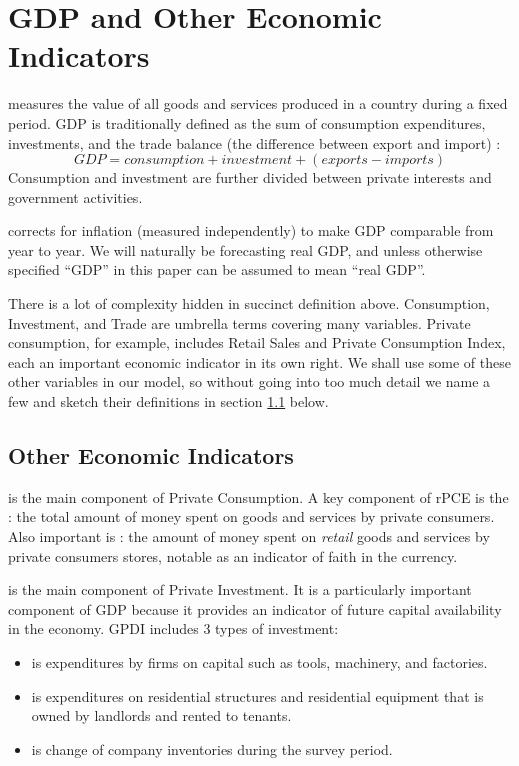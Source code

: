 \section{GDP and Other Economic Indicators}

     measures the value of all goods and
    services produced in a country during a fixed period.  GDP is traditionally defined
    as the sum of consumption expenditures, investments, and the trade balance (the
    difference between export and import) \cite{samuelson}:
    \[ GDP = consumption + investment + (exports - imports) \]
    Consumption and investment are further divided between private
    interests and government activities.

     corrects for inflation (measured independently) to make
    GDP comparable from year to year.  We will naturally be forecasting real GDP,
    and unless otherwise specified ``GDP'' in this paper can be assumed to 
    mean ``real GDP''.

    There is a lot of complexity hidden in succinct definition above.
    Consumption, Investment, and Trade are umbrella terms covering many 
    variables.  Private consumption, for example, includes Retail Sales and 
    Private Consumption Index, each an important economic indicator in its own 
    right.  We shall use some of these other variables in our model,
    so without going into too much detail we name a few and sketch their definitions
    in section \ref{sec:indicators} below.

\subsection{Other Economic Indicators} \label{sec:indicators}

     is the main component of 
    Private Consumption.  A key component of rPCE is the : the total amount of money spent on goods and 
    services by private consumers. Also important is : the amount of money spent on \emph{retail} goods and services by 
    private consumers stores, notable as an indicator of faith in the currency. 

     is the main component of Private 
    Investment.  It is a particularly important component of GDP because it 
    provides an indicator of future capital availability in the economy. GPDI 
    includes 3 types of investment:
    \begin{itemize}
        \item {} is expenditures by firms on capital 
        such as tools, machinery, and factories. 
        \item {} is expenditures on residential 
        structures and residential equipment that is owned by landlords and 
        rented to tenants. 
        \item {} is change of company inventories 
        during the survey period.
    \end{itemize}
        
